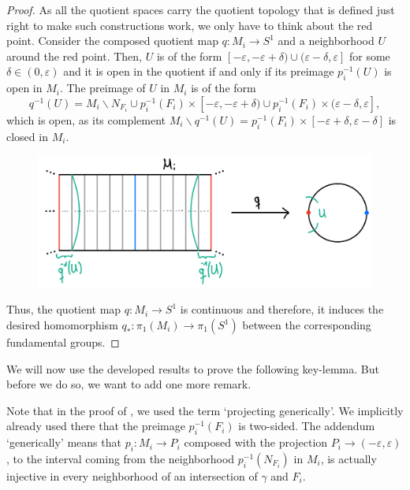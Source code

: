 \begin{proof}
    \noindent
    As all the quotient spaces carry the quotient topology that is defined just right to make such constructions work, we only have to think about the red point.
    Consider the composed quotient map \(q : M_i \to S^1\) and a neighborhood \(U\) around the red point.
    Then, \(U\) is of the form \([-\varepsilon, -\varepsilon + \delta) \cup (\varepsilon - \delta, \varepsilon]\) for some \(\delta \in (0, \varepsilon)\) and it is open in the quotient if and only if its preimage \(p_i^{-1}(U)\) is open in \(M_i\).
    The preimage of \(U\) in \(M_i\) is of the form
    \[q^{-1}(U) = M_i \backslash N_{F_i} \cup p_i^{-1}(F_i) \times [-\varepsilon, -\varepsilon + \delta) \cup p_i^{-1}(F_i) \times (\varepsilon - \delta, \varepsilon],\]
    which is open, as its complement \(M_i \backslash q^{-1}(U) = p_i^{-1}(F_i) \times [-\varepsilon + \delta, \varepsilon - \delta]\) is closed in \(M_i\).
    \begin{figure}[h!]
        \label{img:quotientnbhd}
        \centering
        \includegraphics[width=.5\textwidth]{gfx/Quotient neighborhood .png}
    \end{figure}\vspace*{-2\parskip}

    \noindent
    Thus, the quotient map \(q : M_i \to S^1\) is continuous and therefore, it induces the desired homomorphism \(q_* : \pi_1(M_i) \to \pi_1(S^1)\) between the corresponding fundamental groups.
\end{proof}

We will now use the developed results to prove the following key-lemma.
But before we do so, we want to add one more remark.

\begin{remark} %
    Note that in the proof of , we used the term `projecting generically'.
    We implicitly already used there that the preimage \(p_i^{-1}(F_i)\) is two-sided.
    The addendum `generically' means that \(p_i : M_i \to P_i\) composed with the projection \(P_i \to (-\varepsilon, \varepsilon)\), to the interval coming from the neighborhood \(p_i^{-1}(N_{F_i})\) in \(M_i\), is actually injective in every neighborhood of an intersection of \(\gamma\) and \(F_i\).
\end{remark}

